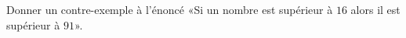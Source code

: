 
\begin{exercice}\label{exosmath-0790}

    Donner un contre-exemple à l'énoncé «Si un nombre est supérieur à \( 16\) alors il est supérieur à \( 91\)».

\end{exercice}
